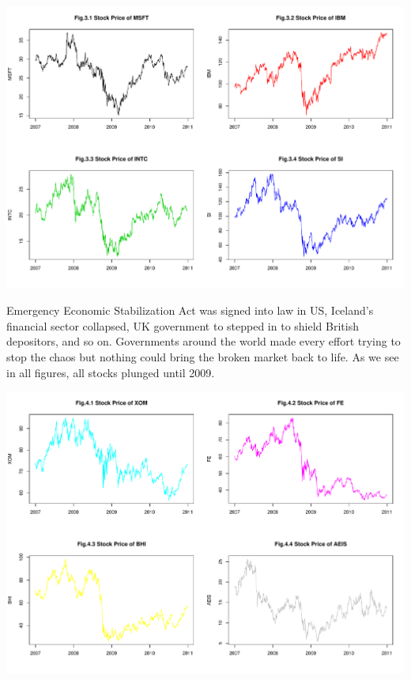 \documentclass[11pt]{article}
\begin{document}
\begin{center}
\includegraphics[width=0.85\linewidth]{graph/TechStockPrice.pdf}
\end{center}\vspace{-1em}
\begin{description}\vspace{-1em}
\item[Oct. 2008] Emergency Economic Stabilization Act was signed into law in US, Iceland’s financial sector collapsed, UK government to stepped in to shield British depositors, and so on. Governments around the world made every effort trying to stop the chaos but nothing could bring the broken market back to life. As we see in all figures, all stocks plunged until 2009.
\end{description}\vspace{-1em}
\begin{center}
\includegraphics[width=0.85\linewidth]{graph/EnergyStockPrice.pdf}
\end{center}
%
%
\end{document}
